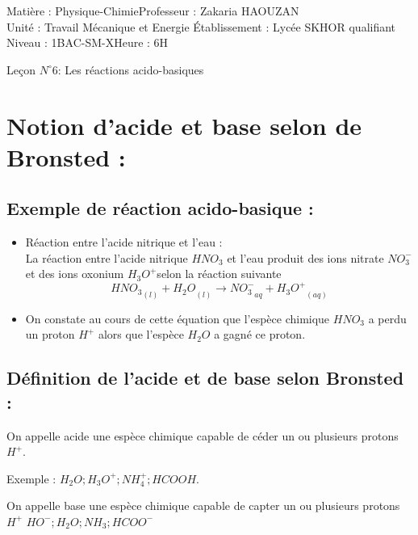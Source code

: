 \documentclass[12pt]{article}
\author{Zakaria HAOUZAN}
\date{\today}
\newcommand\headerMe[2]{\noindent{}#1\hfill#2}
\begin{document}
\headerMe{Matière : Physique-Chimie}{Professeur : Zakaria HAOUZAN}\\
\headerMe{Unité : Travail Mécanique et Energie }{Établissement : Lycée SKHOR qualifiant}\\
\headerMe{Niveau : 1BAC-SM-X}{Heure : 6H}\\

\begin{center}

    \Large{Leçon $N^{\circ} 6 $: \color{red}Les réactions acido-basiques  }
\end{center}

\section{Notion d’acide et base selon de Bronsted : }
\subsection{ Exemple de réaction acido-basique :}
\begin{itemize}
      \item Réaction entre l’acide nitrique et l’eau : 
         \\La réaction entre l’acide nitrique $HNO_3$ et l’eau produit des ions nitrate $NO_3^-$ et des ions oxonium $H_3O^+$selon la réaction suivante $${HNO_3}_{(l)} + {H_2O}_{(l)} \rightarrow {NO_3^-}_{aq} + {H_3O^+}_{(aq)}$$
         \item On constate au cours de cette équation que l’espèce chimique $HNO_3$ a perdu un proton $H^+$ alors que l’espèce $H_2O$ a gagné ce proton.

\end{itemize}
\subsection{Définition de l’acide et de base selon Bronsted : }
On appelle acide une espèce chimique capable de céder un ou plusieurs protons $H^+$.

Exemple : $H_2O ; H_3O^+ ; NH_4^+; HCOOH$.

On appelle base une espèce chimique capable de capter un ou plusieurs protons $H^+$
$HO^{-} ; H_2O ; NH_3 ; HCOO^-$
\end{document}
